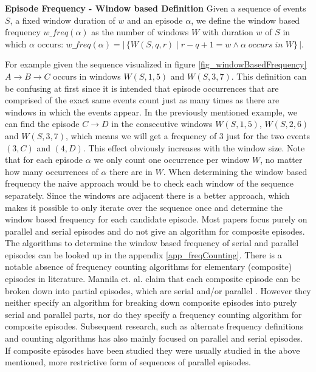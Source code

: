 \begin{mydef}
\label{def_windowBasedFrequency}
\textbf{Episode Frequency - Window based Definition} Given a sequence of events $S$, a fixed window duration of $w$ and an episode $\alpha$, we define the window based frequency $w\_freq(\alpha )$ as the number of windows $W$ with duration $w$ of $S$ in which $\alpha$ occurs: $w\_freq(\alpha ) = |\,\{W(S,q,r) \mid r-q+1 = w \land \alpha \;occurs\; in\; W \}\,|$. %
\end{mydef}


For example given the sequence visualized in figure \ref{fig_windowBasedFrequency} $A \rightarrow B \rightarrow C$ occurs in windows $W(S,1,5)$ and $W(S,3,7)$. \newline 
This definition can be confusing at first since it is intended that episode occurrences that are comprised of the exact same events count just as many times as there are windows in which the events appear. In the previously mentioned example, we can find the episode $C \rightarrow D$ in the consecutive windows $W(S,1,5)$, $W(S,2,6)$ and $W(S,3,7)$, which means we will get a frequency of $3$ just for the two events $(3,C)$ and $(4,D)$. This effect obviously increases with the window size. Note that for each episode $\alpha$ we only count one occurrence per window $W$, no matter how many occurrences of $\alpha$ there are in $W$.\newline
When determining the window based frequency the naive approach would be to check each window of the sequence separately. Since the windows are adjacent there is a better approach, which makes it possible to only iterate over the sequence once and determine the window based frequency for each candidate episode. Most papers focus purely on parallel and serial episodes and do not give an algorithm for composite episodes. The algorithms to determine the window based frequency of serial and parallel episodes can be looked up in the appendix \ref{app_freqCounting}.
There is a notable absence of frequency counting algorithms for elementary (composite) episodes in literature. Mannila et. al. claim that each composite episode can be broken down into partial episodes, which are serial and/or parallel \cite{mannila1997discovery}. However they neither specify an algorithm for breaking down composite episodes into purely serial and parallel parts, nor do they specify a frequency counting algorithm for composite episodes. Subsequent research, such as alternate frequency definitions and counting algorithms has also mainly focused on parallel and serial episodes. If composite episodes have been studied they were usually studied in the above mentioned, more restrictive form of sequences of parallel episodes. \newline

